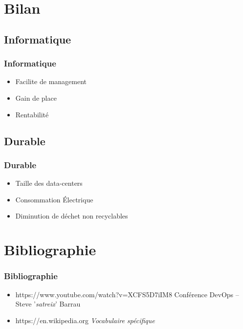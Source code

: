 \documentclass[11pt]{beamer}
\begin{document}
	\section{Bilan}
	\subsection{Informatique}
	\begin{frame} %
		\frametitle{Informatique}
		\begin{itemize}
				\item Facilite de management
				\item Gain de place
				\item Rentabilité 
		\end{itemize}
	\end{frame}
	\subsection{Durable}
	\begin{frame} %
		\frametitle{Durable}
		\begin{itemize}
			\item Taille des data-centers
			\item Consommation Électrique
			\item Diminution de déchet non recyclables
		\end{itemize}
	\end{frame}
	\section{Bibliographie}
	\begin{frame} %
		\frametitle{Bibliographie}
		\begin{itemize}
			\item https://www.youtube.com/watch?v=XCFS5D7iIM8   Conférence DevOps -- Steve '\emph{satreix}' Barrau
			\item https://en.wikipedia.org	\emph{Vocabulaire spécifique}
		\end{itemize}
	\end{frame}
\end{document}
